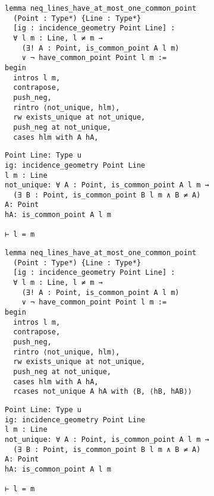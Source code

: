 \begin{frame}[fragile]
	\begin{multicols}{2}
		\begin{lstlisting}
lemma neq_lines_have_at_most_one_common_point 
  (Point : Type*) {Line : Type*} 
  [ig : incidence_geometry Point Line] :
  ∀ l m : Line, l ≠ m → 
    (∃! A : Point, is_common_point A l m) 
    ∨ ¬ have_common_point Point l m := 
begin
  intros l m,
  contrapose,
  push_neg,
  rintro ⟨not_unique, hlm⟩,
  rw exists_unique at not_unique,
  push_neg at not_unique,
  cases hlm with A hA,
\end{lstlisting}
		\columnbreak
		\begin{lstlisting}
Point Line: Type u
ig: incidence_geometry Point Line
l m : Line
not_unique: ∀ A : Point, is_common_point A l m → 
  (∃ B : Point, is_common_point B l m ∧ B ≠ A)
A: Point
hA: is_common_point A l m

⊢ l = m
		\end{lstlisting}
	\end{multicols}
\end{frame}










\begin{frame}[fragile]
	\begin{multicols}{2}
		\begin{lstlisting}
lemma neq_lines_have_at_most_one_common_point 
  (Point : Type*) {Line : Type*} 
  [ig : incidence_geometry Point Line] :
  ∀ l m : Line, l ≠ m → 
    (∃! A : Point, is_common_point A l m) 
    ∨ ¬ have_common_point Point l m := 
begin
  intros l m,
  contrapose,
  push_neg,
  rintro ⟨not_unique, hlm⟩,
  rw exists_unique at not_unique,
  push_neg at not_unique,
  cases hlm with A hA,
  rcases not_unique A hA with ⟨B, ⟨hB, hAB⟩⟩
\end{lstlisting}
		\columnbreak
		\begin{lstlisting}
Point Line: Type u
ig: incidence_geometry Point Line
l m : Line
not_unique: ∀ A : Point, is_common_point A l m → 
  (∃ B : Point, is_common_point B l m ∧ B ≠ A)
A: Point
hA: is_common_point A l m

⊢ l = m
		\end{lstlisting}
	\end{multicols}
\end{frame}










